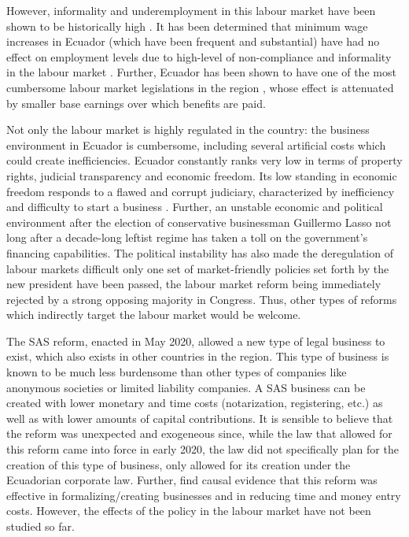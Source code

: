 \documentclass[11pt,a4paper]{article}\usepackage[]{graphicx}\usepackage[]{xcolor}
\begin{document}
However, informality and underemployment in this labour market have been shown to be historically high \parencite{Meneses.2021, Chavez.2012, Mendoza.2020}. It has been determined that minimum wage increases in Ecuador (which have been frequent and substantial) have had no effect on employment levels due to high-level of non-compliance and informality in the labour market \parencite{Canelas.2014}. Further, Ecuador has been shown to have one of the most cumbersome labour market legislations in the region \parencite{MacIsaac.1997}, whose effect is attenuated by smaller base earnings over which benefits are paid.

Not only the labour market is highly regulated in the country: the business environment in Ecuador is cumbersome, including several artificial costs which could create inefficiencies. Ecuador constantly ranks very low in terms of property rights, judicial transparency and economic freedom. Its low standing in economic freedom responds to a flawed and corrupt judiciary, characterized by inefficiency and difficulty to start a business \textcite{Euromonitor.2022}. Further, an unstable economic and political environment after the election of conservative businessman Guillermo Lasso not long after a decade-long leftist regime has taken a toll on the government's financing capabilities. The political instability has also made the deregulation of labour markets difficult only one set of market-friendly policies set forth by the new president have been passed, the labour market reform being immediately rejected by a strong opposing majority in Congress. Thus, other types of reforms which indirectly target the labour market would be welcome. 

The SAS reform, enacted in May 2020, allowed a new type of legal business to exist, which also exists in other countries in the region. This type of business is known to be much less burdensome than other types of companies like anonymous societies or limited liability companies. A SAS business can be created with lower monetary and time costs (notarization, registering, etc.) as well as with lower amounts of capital contributions. It is sensible to believe that the reform was unexpected and exogeneous since, while the law that allowed for this reform came into force in early 2020, the law did not specifically plan for the creation of this type of business, only allowed for its creation under the Ecuadorian corporate law. Further, \textcite{CaminoMogro.2022} find causal evidence that this reform was effective in formalizing/creating businesses and in reducing time and money entry costs. However, the effects of the policy in the labour market have not been studied so far. 
\end{document}
